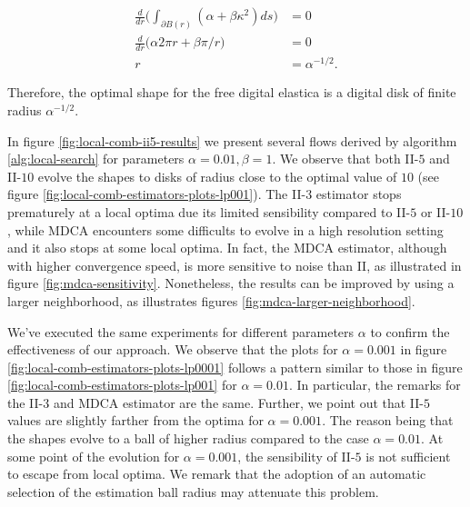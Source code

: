 \begin{align*}
	\frac{d}{dr}\big( \int_{\partial B(r)}{ (\alpha + \beta \kappa ^2) ds} \big ) &= 0\\
	\frac{d}{dr}\big( \alpha 2\pi r + \beta \pi/r \big) &= 0\\
	r &= \alpha^{-1/2}.
\end{align*}  

Therefore, the optimal shape for the free digital elastica is a digital disk of finite radius $\alpha^{-1/2}$.


In figure \ref{fig:local-comb-ii5-results} we present several flows derived by algorithm \ref{alg:local-search} for parameters $\alpha=0.01, \beta=1$. We observe that both II-$5$ and II-$10$ evolve the shapes to disks of radius close to the optimal value of $10$ (see figure \ref{fig:local-comb-estimators-plots-lp001}). The II-$3$ estimator stops prematurely at a local optima due its limited sensibility compared to II-$5$ or II-$10$, while MDCA encounters some difficults to evolve in a high resolution setting and it also stops at some local optima. In fact, the MDCA estimator, although with higher convergence speed, is more sensitive to noise than II, as illustrated in figure \ref{fig:mdca-sensitivity}. Nonetheless, the results can be improved by using a larger neighborhood, as illustrates figures \ref{fig:mdca-larger-neighborhood}.



We've executed the same experiments for different parameters $\alpha$ to confirm the effectiveness of our approach. We observe that the plots for $\alpha=0.001$ in figure \ref{fig:local-comb-estimators-plots-lp0001} follows a pattern similar to those in figure \ref{fig:local-comb-estimators-plots-lp001} for $\alpha=0.01$. In particular, the remarks for the II-$3$ and MDCA estimator are the same. Further, we point out that II-$5$ values are slightly farther from the optima for $\alpha=0.001$. The reason being that the shapes evolve to a ball of higher radius compared to the case $\alpha=0.01$. At some point of the evolution for $\alpha=0.001$, the sensibility of II-$5$ is not sufficient to escape from local optima. We remark that the adoption of an automatic selection of the estimation ball radius may attenuate this problem.


